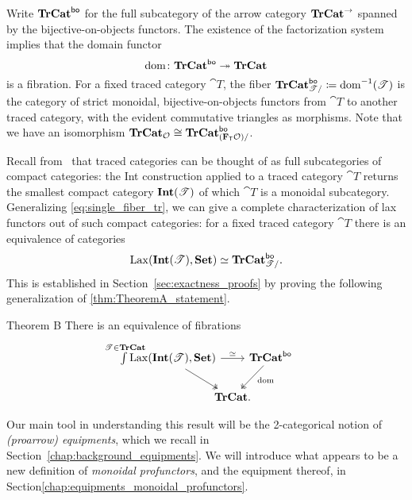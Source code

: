 \documentclass[11pt,oneside,article]{memoir}
\begin{document}
Write $\mathbf{TrCat}^{\mathsf{bo}}$ for the full subcategory of the arrow category $\mathbf{TrCat}^{\to}$ spanned by the bijective-on-objects functors.  The existence of the factorization system implies that the domain functor
\[\operatorname{dom}\colon\mathbf{TrCat}^{\mathsf{bo}}\twoheadrightarrow\mathbf{TrCat}\]
is a fibration.  For a fixed traced category $\cat{T}$, the fiber $\mathbf{TrCat}^{\mathsf{bo}}_{\mathscr{T}/}\coloneqq\operatorname{dom}^{-1}(\mathscr{T})$ is the category of strict monoidal, bijective-on-objects functors from $\cat{T}$ to another traced category, with the evident commutative triangles as morphisms.  Note that we have an isomorphism $\mathbf{TrCat}_{\mathcal{O}}\cong\mathbf{TrCat}^{\mathsf{bo}}_{(\mathbf{F}_{\mathsf{T}}\mathcal{O})/}$.

Recall from~\cite{JoyalStreetVerity} that traced categories can be thought of as full subcategories of compact categories: the Int construction applied to a traced category $\cat{T}$ returns the smallest compact category $\mathbf{Int}(\mathscr{T})$ of which $\cat{T}$ is a monoidal subcategory.  Generalizing \eqref{eq:single_fiber_tr}, we can give a complete characterization of lax functors out of such compact categories: for a fixed traced category $\cat{T}$ there is an equivalence of categories
\[\operatorname{Lax}(\mathbf{Int}(\mathscr{T}),\mathbf{Set})\simeq\mathbf{TrCat}^{\mathsf{bo}}_{\mathscr{T}/}.\]
This is established in Section~\ref{sec:exactness_proofs} by proving the following generalization of \ref{thm:TheoremA_statement}.
\begin{named}{Theorem B}
      \label{thm:TheoremB_statement}
   There is an equivalence of fibrations
   \begin{equation*}
      \begin{tikzcd}[column sep=-1em]
         \int\limits^{\mathclap{\cat{T}\in\TrCat}} \Lax(\Int(\cat{T}),\Set)
               \ar[rr,"\equiv"] \ar[dr,two heads]
            && \TrCat^{\bo} \ar[dl,two heads,"\dom" pos=.4] \\
         & \TrCat. &
      \end{tikzcd}
   \end{equation*}
\end{named}

Our main tool in understanding this result will be the 2-categorical notion of \emph{(proarrow) equipments}, which we recall in Section~\ref{chap:background_equipments}. We will introduce what appears to be a new definition of \emph{monoidal profunctors}, and the equipment thereof, in Section\ref{chap:equipments_monoidal_profunctors}.
\end{document}
